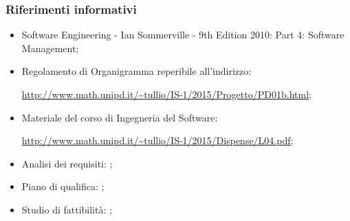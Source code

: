 \documentclass[../PianoProgetto.tex]{subfiles}
\begin{document}
		\subsubsection{Riferimenti informativi}
		\begin{itemize}
		\item Software Engineering - Ian Sommerville - 9th Edition 2010:  Part 4: Software Management;
		\item Regolamento di Organigramma reperibile all'indirizzo: \par
			\url{http://www.math.unipd.it/~tullio/IS-1/2015/Progetto/PD01b.html};
		\item Materiale del corso di Ingegneria del Software: \par
			\url{http://www.math.unipd.it/~tullio/IS-1/2015/Dispense/L04.pdf};
		\item Analisi dei requisiti: \analisideirequisitiv ;
		\item Piano di qualifica: \pianodiqualificav ;
		\item Studio di fattibilità: \studiodifattibilitav ;
		\end{itemize}
			
\end{document}
